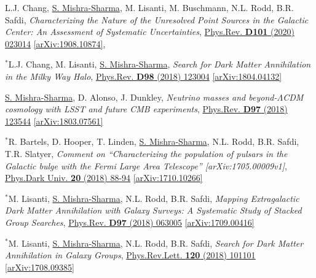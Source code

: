 \documentclass[letterpaper,11pt]{article}
\newenvironment{packed_enumerate}[1][]{
\begin{etaremune}[#1]
  \setlength{\itemsep}{3.7pt}
  \setlength{\parskip}{0pt}
  \setlength{\parsep}{0pt}}{\end{etaremune}
}
\begin{document}
\begin{packed_enumerate}[start=37]
  \item L.J. Chang, \underline{S. Mishra-Sharma}, M. Lisanti, M. Buschmann, N.L. Rodd, B.R. Safdi, \emph{Characterizing the Nature of the Unresolved Point Sources in the Galactic Center: An Assessment of Systematic Uncertainties},  \href{https://journals.aps.org/prd/abstract/10.1103/PhysRevD.101.023014}{Phys.Rev. \textbf{D101} (2020) 023014} \href{https://arxiv.org/abs/1908.10874}{[arXiv:1908.10874]}, 

  \item $^*$L.J. Chang, M. Lisanti, \underline{S. Mishra-Sharma}, \emph{Search for Dark Matter Annihilation in the Milky Way Halo}, \href{https://journals.aps.org/prd/abstract/10.1103/PhysRevD.98.123004}{Phys.Rev. \textbf{D98} (2018) 123004} \href{https://arxiv.org/abs/1804.04132}{[arXiv:1804.04132]}

  \item \underline{S. Mishra-Sharma}, D. Alonso, J. Dunkley, \emph{Neutrino masses and beyond-$\Lambda$CDM cosmology with LSST and future CMB experiments}, \href{https://journals.aps.org/prd/abstract/10.1103/PhysRevD.97.123544}{Phys.Rev. \textbf{D97} (2018) 123544}  \href{https://arxiv.org/abs/1803.07561}{[arXiv:1803.07561]}

  \item $^*$R. Bartels, D. Hooper, T. Linden, \underline{S. Mishra-Sharma}, N.L. Rodd, B.R. Safdi, T.R. Slatyer, \emph{Comment on ``Characterizing the population of pulsars in the Galactic bulge with the
  {\it Fermi} Large Area Telescope'' [arXiv:1705.00009\MakeLowercase{v}1]}, \href{https://www.sciencedirect.com/science/article/pii/S2212686418300268}{Phys.Dark Univ. \textbf{20} (2018) 88-94} \href{https://arxiv.org/abs/1710.10266}{[arXiv:1710.10266]}

  \item $^*$M. Lisanti, \underline{S. Mishra-Sharma}, N.L. Rodd, B.R. Safdi, \emph{Mapping Extragalactic Dark Matter Annihilation with Galaxy Surveys: A Systematic Study of Stacked Group Searches},  \href{https://journals.aps.org/prd/abstract/10.1103/PhysRevD.97.063005}{Phys.Rev. \textbf{D97} (2018) 063005} \href{https://arxiv.org/abs/1709.00416}{[arXiv:1709.00416]}

  \item $^*$M. Lisanti, \underline{S. Mishra-Sharma}, N.L. Rodd, B.R. Safdi, \emph{Search for Dark Matter Annihilation in Galaxy Groups},  \href{https://journals.aps.org/prl/abstract/10.1103/PhysRevLett.120.101101}{Phys.Rev.Lett. \textbf{120} (2018) 101101} \href{https://arxiv.org/abs/1708.09385}{[arXiv:1708.09385]}


\end{packed_enumerate}
\end{document}

